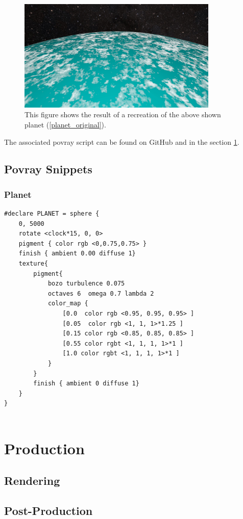 \begin{figure}[ht]
	\centering
	\includegraphics[width=0.85\textwidth]{images/scene04_05.jpg}
	\caption{This figure shows the result of a recreation of the above shown planet (\ref{planet_original}).}
	\label{planet_povray}
\end{figure}

The associated povray script can be found on GitHub \cite{Quving} and in the section \ref{povray_snippets}.

\newpage
\section{Povray Snippets} \label{povray_snippets}

\subsection{Planet}
\begin{lstlisting}
#declare PLANET = sphere {
	0, 5000
	rotate <clock*15, 0, 0>
	pigment { color rgb <0,0.75,0.75> }
	finish { ambient 0.00 diffuse 1}
	texture{
		pigment{
			bozo turbulence 0.075
			octaves 6  omega 0.7 lambda 2
			color_map {
				[0.0  color rgb <0.95, 0.95, 0.95> ]
				[0.05  color rgb <1, 1, 1>*1.25 ]
				[0.15 color rgb <0.85, 0.85, 0.85> ]
				[0.55 color rgbt <1, 1, 1, 1>*1 ]
				[1.0 color rgbt <1, 1, 1, 1>*1 ]
			}
		}
		finish { ambient 0 diffuse 1}
	}
}


\end{lstlisting}

\chapter{Production}
\section{Rendering}
\section{Post-Production}